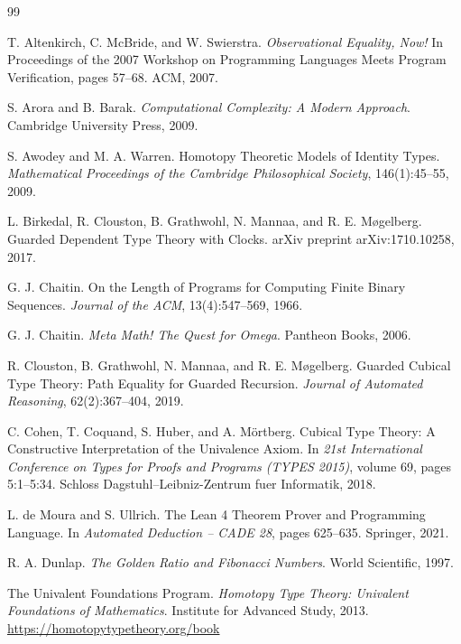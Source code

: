 \documentclass[11pt]{article}
\theoremstyle{definition}
\theoremstyle{remark}
\begin{document}
\begin{thebibliography}{99}

T. Altenkirch, C. McBride, and W. Swierstra.
\textit{Observational Equality, Now!}
In Proceedings of the 2007 Workshop on Programming Languages Meets Program Verification, pages 57--68. ACM, 2007.

S. Arora and B. Barak.
\textit{Computational Complexity: A Modern Approach}.
Cambridge University Press, 2009.

S. Awodey and M. A. Warren.
Homotopy Theoretic Models of Identity Types.
\textit{Mathematical Proceedings of the Cambridge Philosophical Society}, 146(1):45--55, 2009.

L. Birkedal, R. Clouston, B. Grathwohl, N. Mannaa, and R. E. Møgelberg.
Guarded Dependent Type Theory with Clocks.
arXiv preprint arXiv:1710.10258, 2017.

G. J. Chaitin.
On the Length of Programs for Computing Finite Binary Sequences.
\textit{Journal of the ACM}, 13(4):547--569, 1966.

G. J. Chaitin.
\textit{Meta Math! The Quest for Omega}.
Pantheon Books, 2006.

R. Clouston, B. Grathwohl, N. Mannaa, and R. E. Møgelberg.
Guarded Cubical Type Theory: Path Equality for Guarded Recursion.
\textit{Journal of Automated Reasoning}, 62(2):367--404, 2019.

C. Cohen, T. Coquand, S. Huber, and A. Mörtberg.
Cubical Type Theory: A Constructive Interpretation of the Univalence Axiom.
In \textit{21st International Conference on Types for Proofs and Programs (TYPES 2015)}, volume 69, pages 5:1--5:34. Schloss Dagstuhl--Leibniz-Zentrum fuer Informatik, 2018.

L. de Moura and S. Ullrich.
The Lean 4 Theorem Prover and Programming Language.
In \textit{Automated Deduction -- CADE 28}, pages 625--635. Springer, 2021.

R. A. Dunlap.
\textit{The Golden Ratio and Fibonacci Numbers}.
World Scientific, 1997.

The Univalent Foundations Program.
\textit{Homotopy Type Theory: Univalent Foundations of Mathematics}.
Institute for Advanced Study, 2013.
\url{https://homotopytypetheory.org/book}


\end{thebibliography}
\end{document}
